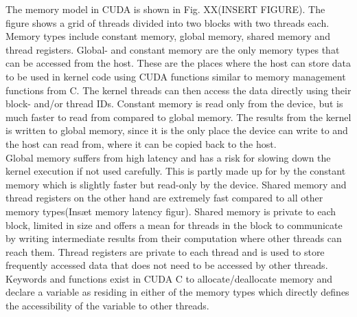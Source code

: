 The memory model in CUDA is shown in Fig. XX(INSERT FIGURE). The figure shows a grid of threads divided into two blocks with two threads each. Memory types include constant memory, global memory, shared memory and thread registers. Global- and constant memory are the only memory types that can be accessed from the host. These are the places where the host can store data to be used in kernel code using CUDA functions similar to memory management functions from C. The kernel threads can then access the data directly using their block- and/or thread IDs. Constant memory is read only from the device, but is much faster to read from compared to global memory. The results from the kernel is written to global memory, since it is the only place the device can write to and the host can read from, where it can be copied back to the host.\\

Global memory suffers from high latency and has a risk for slowing down the kernel execution if not used carefully. This is partly made up for by the constant memory which is slightly faster but read-only by the device. Shared memory and thread registers on the other hand are extremely fast compared to all other memory types(Insæt memory latency figur). Shared memory is private to each block, limited in size and offers a mean for threads in the block to communicate by writing intermediate results from their computation where other threads can reach them. Thread registers are private to each thread and is used to store frequently accessed data that does not need to be accessed by other threads. Keywords and functions exist in CUDA C to allocate/deallocate memory and declare a variable as residing in either of the memory types which directly defines the accessibility of the variable to other threads.